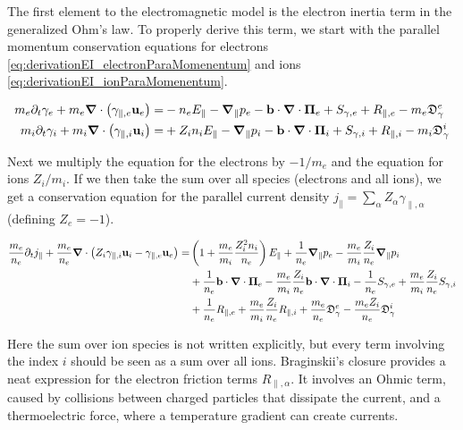 The first element to the electromagnetic model is the electron inertia term in the generalized Ohm's law. To properly derive this term, we start with the parallel momentum conservation equations for electrons \ref{eq:derivationEI_electronParaMomenentum} and ions \ref{eq:derivationEI_ionParaMomenentum}.

\begin{align}
	m_e\partial_t \gamma_{e} + m_e\grad\cdot\left(\gamma_{\parallel,e}\mathbf{u}_e\right) =& -n_eE_\parallel -\grad_\parallel{p_e} - \mathbf{b}\cdot\grad\cdot\boldsymbol{\Pi}_e + S_{\gamma,e} + R_{\parallel,e} - m_e\mathfrak{D}_\gamma^e \label{eq:derivationEI_electronParaMomenentum} \\
	m_i\partial_t \gamma_{i} + m_i\grad\cdot\left(\gamma_{\parallel,i}\mathbf{u}_i\right) =& + Z_in_iE_\parallel -\grad_\parallel{p_i} - \mathbf{b}\cdot\grad\cdot\boldsymbol{\Pi}_i + S_{\gamma,i} + R_{\parallel,i} - m_i\mathfrak{D}_\gamma^i \label{eq:derivationEI_ionParaMomenentum}
\end{align}

Next we multiply the equation for the electrons by $-1/m_e$ and the equation for ions $Z_i/m_i$. If we then take the sum over all species (electrons and all ions), we get a conservation equation for the parallel current density $j_\parallel = \sum_{\alpha} Z_\alpha \gamma_{\parallel,\alpha} $ (defining $Z_e = -1$).

\begin{align}
	\label{eq:S3X_differenceGammaeGammai}
	\frac{m_e}{n_e}\partial_t j_\parallel + \frac{m_e}{n_e}\grad\cdot\left(Z_i\gamma_{\parallel,i}\mathbf{u}_i - \gamma_{\parallel,e}\mathbf{u}_e\right) = &  
	\left(1 + \frac{m_e}{m_i}\frac{Z_i^2n_i}{n_e}\right)E_\parallel + \frac{1}{n_e}\grad_\parallel{p_e} - \frac{m_e}{m_i}\frac{Z_i}{n_e}\grad_\parallel{p_i} \nonumber \\ 
	&+ \frac{1}{n_e}\mathbf{b}\cdot\grad\cdot\boldsymbol{\Pi}_e - \frac{m_e}{m_i}\frac{Z_i}{n_e}\mathbf{b}\cdot\grad\cdot\boldsymbol{\Pi}_i - \frac{1}{n_e}S_{\gamma,e} + \frac{m_e}{m_i}\frac{Z_i}{n_e}S_{\gamma,i} \nonumber \\ 
	&+ \frac{1}{n_e}R_{\parallel,e} + \frac{m_e}{m_i}\frac{Z_i}{n_e}R_{\parallel,i} + \frac{m_e}{n_e}\mathfrak{D}_\gamma^e - \frac{m_eZ_i}{n_e}\mathfrak{D}_\gamma^i
\end{align}

Here the sum over ion species is not written explicitly, but every term involving the index $i$ should be seen as a sum over all ions. Braginskii's closure provides a neat expression for the electron friction terms $R_{\parallel,\alpha}$. It involves an Ohmic term, caused by collisions between charged particles that dissipate the current, and a thermoelectric force, where a temperature gradient can create currents. 

